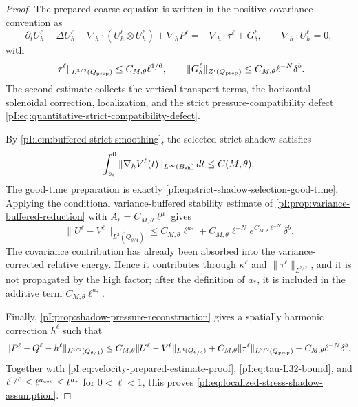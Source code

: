 \documentclass[11pt]{article}
\numberwithin{equation}{section}
\theoremstyle{plain}
\theoremstyle{definition}
\theoremstyle{remark}
\newcommand{\nabh}{\nabla_h}
\newcommand{\divh}{\nabla_h\!\cdot}
\begin{document}
\begin{proof}
The prepared coarse equation is written in the positive covariance convention as
\[
        \partial_tU_h^\ell-\Delta U_h^\ell
        +\divh(U_h^\ell\otimes U_h^\ell)+\nabh P^\ell
        =-\divh \tau^\ell+G_\delta^\ell,
        \qquad \divh U_h^\ell=0,
\]
with
\[
        \|\tau^\ell\|_{L^{3/2}(Q_{\rm prep})}
        \le C_{M,\theta}\ell^{1/6},
        \qquad
        \|G_\delta^\ell\|_{Z'(Q_{\rm prep})}
        \le C_{M,\theta}\ell^{-N}\delta^b .
\]
The second estimate collects the vertical transport terms, the horizontal solenoidal correction, localization, and the strict pressure-compatibility defect \eqref{pI:eq:quantitative-strict-compatibility-defect}.

By \cref{pI:lem:buffered-strict-smoothing}, the selected strict shadow satisfies
\begin{equation}\label{pI:eq:buffered-shadow-bound-proof}
        \int_{s_\ell}^{0}\|\nabh V^\ell(t)\|_{L^\infty(B_{\rm sh})}\,dt
        \le C(M,\theta).
\end{equation}
The good-time preparation is exactly \eqref{pI:eq:strict-shadow-selection-good-time}.  Applying the conditional variance-buffered stability estimate of \cref{pI:prop:variance-buffered-reduction} with \(A_\ell=C_{M,\theta}\ell^\mu\) gives
\begin{equation}\label{pI:eq:velocity-prepared-estimate-proof}
        \|U^\ell-V^\ell\|_{L^3(Q_{\theta/4})}
        \le C_{M,\theta}\ell^{a_*}
        +C_{M,\theta}\ell^{-N}e^{C_{M,\theta}\ell^{-N}}\delta^b .
\end{equation}
The covariance contribution has already been absorbed into the variance-corrected relative energy.  Hence it contributes through \(\kappa^\ell\) and \(\|\tau^\ell\|_{L^{3/2}}\), and it is not propagated by the high factor; after the definition of \(a_*\), it is included in the additive term \(C_{M,\theta}\ell^{a_*}\).

Finally, \cref{pI:prop:shadow-pressure-reconstruction} gives a spatially harmonic correction \(h^\ell\) such that
\[
        \|P^\ell-Q^\ell-h^\ell\|_{L^{3/2}(Q_{\theta/4})}
        \le C_{M,\theta}\|U^\ell-V^\ell\|_{L^3(Q_{\theta/4})}
        +C_{M,\theta}\|\tau^\ell\|_{L^{3/2}(Q_{\rm prep})}
        +C_{M,\theta}\ell^{-N}\delta^b .
\]
Together with \eqref{pI:eq:velocity-prepared-estimate-proof}, \eqref{pI:eq:tau-L32-bound}, and \(\ell^{1/6}\le \ell^{a_{\rm cov}}\le \ell^{a_*}\) for \(0<\ell<1\), this proves \eqref{pI:eq:localized-stress-shadow-assumption}.
\end{proof}
\end{document}
